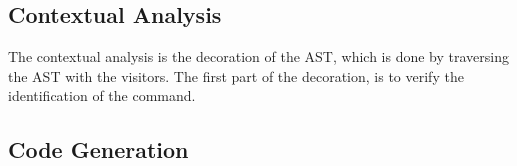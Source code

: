 \subsection{Contextual Analysis}
\label{sec:ai_contextual_analysis}
The contextual analysis is the decoration of the AST, which is done by traversing the AST with the visitors. 
The first part of the decoration, is to verify the identification of the command.\\


\subsection{Code Generation}